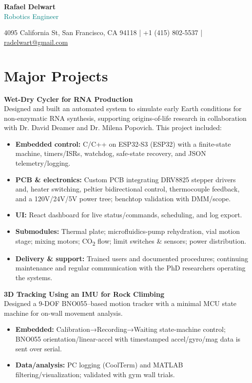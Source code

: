 \documentclass[a4paper,9pt]{article}
\begin{document}
\begin{center}
    {\Large \textbf{Rafael Delwart}} \\
    {\small \textcolor{teal}{Robotics Engineer}} \\
    \vspace{0.2em}
    {\footnotesize
        4095 California St, San Francisco, CA 94118 \quad | \quad
        +1 (415) 802-5537 \quad | \quad
        \href{mailto:radelwart@gmail.com}{radelwart@gmail.com} \quad 
        
    }
    \vspace{0.5em}
\end{center}


\section*{Major Projects}

\small 
\textbf{Wet-Dry Cycler for RNA Production} \\
Designed and built an automated system to simulate early Earth conditions for non-enzymatic RNA synthesis, supporting origins-of-life research in collaboration with Dr. David Deamer and Dr. Milena Popovich. This project included:
\begin{itemize}[leftmargin=*,itemsep=1pt,topsep=0pt,parsep=0pt,partopsep=0pt]
  \item \textbf{Embedded control:} C/C++ on ESP32-S3 (ESP32) with a finite-state machine, timers/ISRs, watchdog, safe-state recovery, and JSON telemetry/logging.
  \item \textbf{PCB \& electronics:} Custom PCB integrating DRV8825 stepper drivers and, heater switching, peltier bidirectional control, thermocouple feedback, and a 120V/24V/5V power tree; benchtop validation with DMM/scope.
  \item \textbf{UI:} React dashboard for live status/commands, scheduling, and log export.
  \item \textbf{Submodules:} Thermal plate; microfluidics-pump rehydration, vial motion stage; mixing motors; CO\textsubscript{2} flow; limit switches \& sensors; power distribution.
  \item \textbf{Delivery \& support:} Trained users and documented procedures; continuing maintenance and regular communication with the PhD researchers operating the systems.
\end{itemize}


\textbf{3D Tracking Using an IMU for Rock Climbing} \\
Designed a 9-DOF BNO055–based motion tracker with a minimal MCU state machine for on-wall movement analysis.
\begin{itemize}[leftmargin=*,itemsep=1pt,topsep=0pt,parsep=0pt,partopsep=0pt]
  \item \textbf{Embedded:} Calibration→Recording→Waiting state-machine control; BNO055 orientation/linear-accel with timestamped accel/gyro/mag data is sent over serial.
  \item \textbf{Data/analysis:} PC logging (CoolTerm) and MATLAB filtering/visualization; validated with gym wall trials.
\end{itemize}
\end{document}
